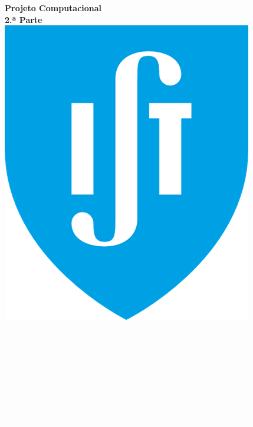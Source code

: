 \documentclass[12pt,a4paper]{article}
\begin{document}
\begin{titlepage}
        \begin{spacing}{1.5}
        \begin{flushleft}
        {\Huge \textbf{Projeto Computacional}}\\ [10pt]
        {\huge  \textbf{2.ª Parte}}\\ [48pt]
        {\includegraphics[scale=0.40]{IST_Logo.png}} \\ [1.5cm]
        \end{flushleft}
        \end{spacing}
        \begin{minipage}{2cm}
        \end{minipage} 
        \vspace{6.4 cm}
        \begin{flushleft}
        
        \Large \textcolor{white}{
            Trabalho realizado por: \\
            Afonso Ribeiro, ist1102763 \\
            Diogo Rodrigues, ist1113787 \\
            Pedro Mendes, ist1109994 \\
            \vspace{0.5cm} \\
            Com o apoio dos professores: \\
            Pedro Lima \\
            André Crispim
        }
        \end{flushleft}
        \vspace{1cm}
     \end{titlepage}
\end{document}
